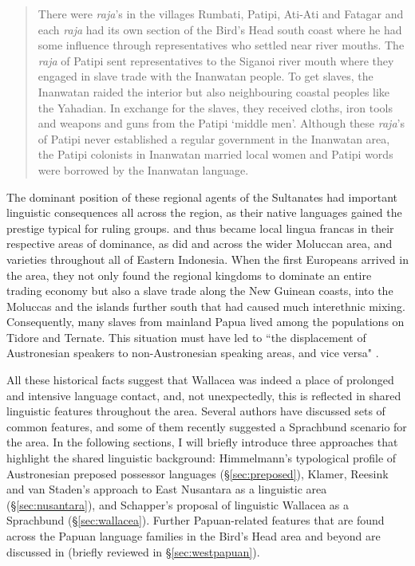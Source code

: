 \begin{quote}There were \textit{raja}'s in the villages Rumbati, Patipi, Ati-Ati and Fatagar and each \textit{raja} had its own section of the Bird's Head south coast where he had some influence through representatives who settled near river mouths. The \textit{raja} of Patipi sent representatives to the Siganoi river mouth where they engaged in slave trade with the Inanwatan people. To get slaves, the Inanwatan raided the interior but also neighbouring coastal peoples like the Yahadian. In exchange for the slaves, they received cloths, iron tools and weapons and guns from the Patipi `middle men'. Although these \textit{raja}'s of Patipi never established a regular government in the Inanwatan area, the Patipi colonists in Inanwatan married local women and Patipi words were borrowed by the Inanwatan language.\end{quote}

The dominant position of these regional agents of the Sultanates had important linguistic consequences all across the region, as their native languages gained the prestige typical for ruling groups.  and  thus became local lingua francas in their respective areas of dominance, as did  and  across the wider Moluccan area, and  varieties throughout all of Eastern Indonesia. When the first Europeans arrived in the area, they not only found the regional kingdoms to dominate an entire trading economy but also a slave trade along the New Guinean coasts, into the Moluccas and the islands further south that had caused much interethnic mixing. Consequently, many slaves from mainland Papua lived among the populations on Tidore and Ternate. This situation must have led to ``the displacement of Austronesian speakers to non-Austronesian speaking areas, and vice versa" \citep[105f.]{klamer2008east}.

All these historical facts suggest that Wallacea was indeed a place of prolonged and intensive language contact, and, not unexpectedly, this is reflected in shared linguistic features throughout the area. Several authors have discussed sets of common features, and some of them recently suggested a Sprachbund scenario for the area. In the following sections, I will briefly introduce three approaches that highlight the shared linguistic background: Himmelmann's typological profile of Austronesian preposed possessor languages (§\ref{sec:preposed}), Klamer, Reesink and van Staden's approach to East Nusantara as a linguistic area (§\ref{sec:nusantara}), and Schapper's proposal of linguistic Wallacea as a Sprachbund (§\ref{sec:wallacea}). Further Papuan-related features that are found across the Papuan language families in the Bird's Head area and beyond are discussed in \citet{reesink2005west} (briefly reviewed in §\ref{sec:westpapuan}).

